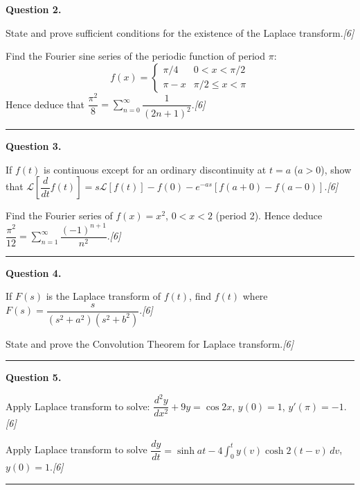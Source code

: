 \documentclass[11pt,a4paper]{article}
\newcommand{\pts}[1]{\hfill   \textit{[#1]}}
\begin{document}
\medskip


\noindent   \textbf{Question 2.}

\begin{parts}
  \item State and prove sufficient conditions for the existence of the Laplace transform.\pts{6}
  \item Find the Fourier sine series of the periodic function of period $\pi$:
    \[
      f(x) = 
\begin{cases} \pi/4 & 0 < x < \pi/2 \\ \pi - x & \pi/2 \leq x < \pi \end{cases}
    \]
    Hence deduce that $\dfrac{\pi^2}{8}=\sum_{n=0}^{\infty}\dfrac{1}{(2n+1)^2}$.\pts{6}
\end{parts}
\medskip\rule{\linewidth}{0.2pt}

\medskip


\noindent   \textbf{Question 3.}

\begin{parts}
  \item If $f(t)$ is continuous except for an ordinary discontinuity at $t=a$ ($a>0$), show that $\mathcal{L}\!\left[\dfrac{d}{dt}f(t)\right]=s\mathcal{L}[f(t)]-f(0)-e^{-as}[f(a+0)-f(a-0)]$.\pts{6}
  \item Find the Fourier series of $f(x)=x^2$, $0<x<2$ (period 2). Hence deduce $\dfrac{\pi^2}{12}=\sum_{n=1}^{\infty}\dfrac{(-1)^{n+1}}{n^2}$.\pts{6}
\end{parts}
\medskip\rule{\linewidth}{0.2pt}

\medskip


\noindent   \textbf{Question 4.}

\begin{parts}
  \item If $F(s)$ is the Laplace transform of $f(t)$, find $f(t)$ where $F(s)=\dfrac{s}{(s^2+a^2)(s^2+b^2)}$.\pts{6}
  \item State and prove the Convolution Theorem for Laplace transform.\pts{6}
\end{parts}
\medskip\rule{\linewidth}{0.2pt}

\medskip


\noindent   \textbf{Question 5.}

\begin{parts}
  \item Apply Laplace transform to solve: $\dfrac{d^2y}{dx^2}+9y=\cos 2x$, $y(0)=1$, $y'(\pi)=-1$.\pts{6}
  \item Apply Laplace transform to solve $\dfrac{dy}{dt}=\sinh at-4\int_0^t y(v)\cosh 2(t-v)\,dv$, $y(0)=1$.\pts{6}
\end{parts}
\medskip\rule{\linewidth}{0.2pt}
\end{document}
